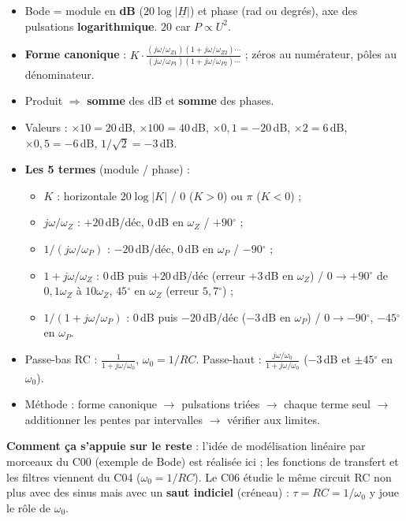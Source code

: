\begin{recapbox}[title={Récap pour l'examen --- C05 : Bode}]
\begin{itemize}
  \item Bode = module en \textbf{dB} ($20\log|\underline H|$) et phase (rad ou degrés), axe
        des pulsations \textbf{logarithmique}. $20$ car $P\propto U^2$.
  \item \textbf{Forme canonique} : $K\cdot\frac{(j\omega/\omega_{Z1})(1 + j\omega/\omega_{Z2})\cdots}{(j\omega/\omega_{P1})(1 + j\omega/\omega_{P2})\cdots}$ ;
        zéros au numérateur, pôles au dénominateur.
  \item Produit $\Rightarrow$ \textbf{somme} des dB et \textbf{somme} des phases.
  \item Valeurs : $\times10 = 20$\,dB, $\times100 = 40$\,dB, $\times0{,}1 = -20$\,dB,
        $\times2 = 6$\,dB, $\times0{,}5 = -6$\,dB, $1/\sqrt2 = -3$\,dB.
  \item \textbf{Les 5 termes} (module / phase) :
  \begin{itemize}
    \item $K$ : horizontale $20\log|K|$ / $0$ ($K>0$) ou $\pi$ ($K<0$) ;
    \item $j\omega/\omega_Z$ : $+20$\,dB/déc, 0\,dB en $\omega_Z$ / $+90\ensuremath{^\circ}$ ;
    \item $1/(j\omega/\omega_P)$ : $-20$\,dB/déc, 0\,dB en $\omega_P$ / $-90\ensuremath{^\circ}$ ;
    \item $1 + j\omega/\omega_Z$ : 0\,dB puis $+20$\,dB/déc (erreur $+3$\,dB en $\omega_Z$) /
          $0\to+90\ensuremath{^\circ}$ de $0{,}1\omega_Z$ à $10\omega_Z$, $45\ensuremath{^\circ}$ en $\omega_Z$ (erreur $5{,}7\ensuremath{^\circ}$) ;
    \item $1/(1 + j\omega/\omega_P)$ : 0\,dB puis $-20$\,dB/déc ($-3$\,dB en $\omega_P$) /
          $0\to-90\ensuremath{^\circ}$, $-45\ensuremath{^\circ}$ en $\omega_P$.
  \end{itemize}
  \item Passe-bas RC : $\frac1{1 + j\omega/\omega_0}$, $\omega_0 = 1/RC$. Passe-haut :
        $\frac{j\omega/\omega_0}{1 + j\omega/\omega_0}$ ($-3$\,dB et $\pm45\ensuremath{^\circ}$ en $\omega_0$).
  \item Méthode : forme canonique $\to$ pulsations triées $\to$ chaque terme seul $\to$
        additionner les pentes par intervalles $\to$ vérifier aux limites.
\end{itemize}
\textbf{Comment ça s'appuie sur le reste} : l'idée de \og modélisation linéaire par
morceaux\fg{} du C00 (exemple de Bode) est réalisée ici ; les fonctions de transfert et les
filtres viennent du C04 ($\omega_0 = 1/RC$). Le C06 étudie le même circuit RC non plus avec
des sinus mais avec un \textbf{saut indiciel} (créneau) : $\tau = RC = 1/\omega_0$ y joue le
rôle de $\omega_0$.
\end{recapbox}
